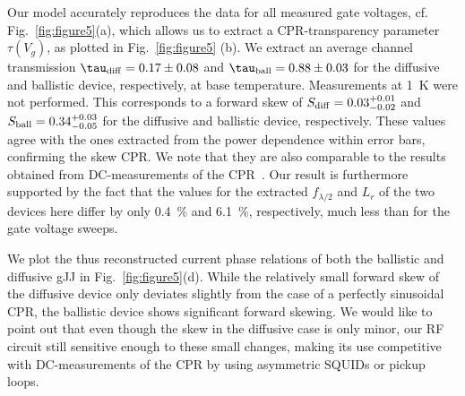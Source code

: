 Our model accurately reproduces the data for all measured gate voltages, cf. Fig.~\ref{fig:figure5}(a), which allows us to extract a CPR-transparency parameter $\tau(V_g)$, as plotted in Fig.~\ref{fig:figure5}
(b).
%
We extract an average channel transmission $\tau_{\rm diff}=0.17\pm0.08$ and $\tau_{\rm ball}=0.88\pm0.03$ for the diffusive and ballistic device, respectively, at base temperature.
%
Measurements at \SI{1}{\kelvin} were not performed.
%
This corresponds to a forward skew of $S_{\rm diff}=0.03_{-0.02}^{+0.01}$ and $S_{\rm ball}=0.34_{-0.05}^{+0.03}$ for the diffusive and ballistic device, respectively.
%
These values agree with the ones extracted from the power dependence within error bars, confirming the skew CPR.
%
We note that they are also comparable to the results obtained from DC-measurements of the CPR~\cite{englishObservationNonsinusoidalCurrentphase2016,nandaCurrentPhaseRelationBallistic2017}.
%
Our result is furthermore supported by the fact that the values for the extracted $f_{\lambda/2}$ and $L_r$ of the two devices here differ by only \SI{0.4}{\percent} and \SI{6.1}{\percent}, respectively, much less than for the gate voltage sweeps.

We plot the thus reconstructed current phase relations of both the ballistic and diffusive gJJ in Fig.~\ref{fig:figure5}(d).
%
While the relatively small forward skew of the diffusive device only deviates slightly from the case of a perfectly sinusoidal CPR, the ballistic device shows significant forward skewing.
%
We would like to point out that even though the skew in the diffusive case is only minor, our RF circuit still sensitive enough to these small changes, making its use competitive with DC-measurements of the CPR by using asymmetric SQUIDs or pickup loops.

